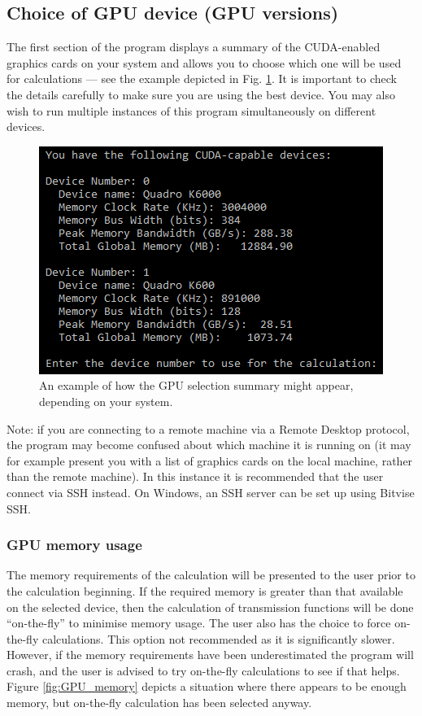\documentclass[12pt,a4paper]{article}
\begin{document}
\subsection{Choice of GPU device (GPU versions)}

The first section of the program displays a summary of the CUDA-enabled graphics cards on your system and allows you to choose which one will be used for calculations --- see the example depicted in Fig. \ref{fig:GPU}.
It is important to check the details carefully to make sure you are using the best device.
You may also wish to run multiple instances of this program simultaneously on different devices.

\begin{figure}[!h]
\begin{center}
\includegraphics[scale=0.75]{Figures/GPU.png}
\caption{An example of how the GPU selection summary might appear, depending on your system.}
\label{fig:GPU}
\end{center}
\end{figure}

Note: if you are connecting to a remote machine via a Remote Desktop protocol, the program may become confused about which machine it is running on (it may for example present you with a list of graphics cards on the local machine, rather than the remote machine).
In this instance it is recommended that the user connect via SSH instead.
On Windows, an SSH server can be set up using Bitvise SSH.

\subsubsection{GPU memory usage}

The memory requirements of the calculation will be presented to the user prior to the calculation beginning.
If the required memory is greater than that available on the selected device, then the calculation of transmission functions will be done ``on-the-fly'' to minimise memory usage.
The user also has the choice to force on-the-fly calculations.
This option not recommended as it is significantly slower.
However, if the memory requirements have been underestimated the program will crash, and the user is advised to try on-the-fly calculations to see if that helps.
Figure \ref{fig:GPU_memory} depicts a situation where there appears to be enough memory, but on-the-fly calculation has been selected anyway.
\end{document}
